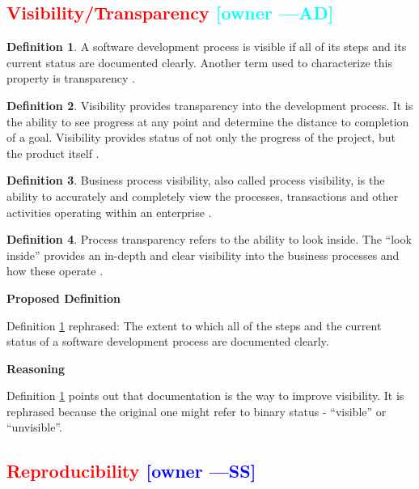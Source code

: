 \documentclass[letterpaper,cleveref]{lipics-v2019}
\newcommand{\authornote}[3]{\textcolor{#1}{[#3 ---#2]}}
\newcommand{\authornote}[3]{}
\newcommand{\wss}[1]{\authornote{blue}{SS}{#1}} %
\newcommand{\ad}[1]{\authornote{cyan}{AD}{#1}} %
\newcommand{\notdone}[1]{\textcolor{red}{#1}}
\theoremstyle{definition}
\newtheorem{defn}{Definition}
\begin{document}
\subsection{\notdone{Visibility/Transparency} \ad{owner}}

\begin{defn}
  \label{VisibilitySelected}
  A software development process is visible if all of its steps and its current
  status are documented clearly. Another term used to characterize this property
  is transparency \citep{ghezzi1991fundamentals}.
\end{defn}

\begin{defn}
  Visibility provides transparency into the development process. It is the
  ability to see progress at any point and determine the distance to completion
  of a goal.  Visibility provides status of not only the progress of the
  project, but the product itself \citep{GSA2019}.
\end{defn}

\begin{defn}
  Business process visibility, also called process visibility, is the ability to
  accurately and completely view the processes, transactions and other
  activities operating within an enterprise \citep{Rouse2013}.
\end{defn}

\begin{defn}
  Process transparency refers to the ability to look inside. The “look inside”
  provides an in-depth and clear visibility into the business processes and how
  these operate \citep{PRIME2019}.
\end{defn}

\noindent \textbf{Proposed Definition} 

Definition \ref{VisibilitySelected} rephrased: The extent to which all of the
steps and the current status of a software development process are documented
clearly.

\noindent \textbf{Reasoning}

Definition \ref{VisibilitySelected} points out that documentation is the way to
improve visibility. It is rephrased because the original one might refer to
binary status - ``visible'' or ``unvisible''.

\subsection{\notdone{Reproducibility} \wss{owner}}
\end{document}
